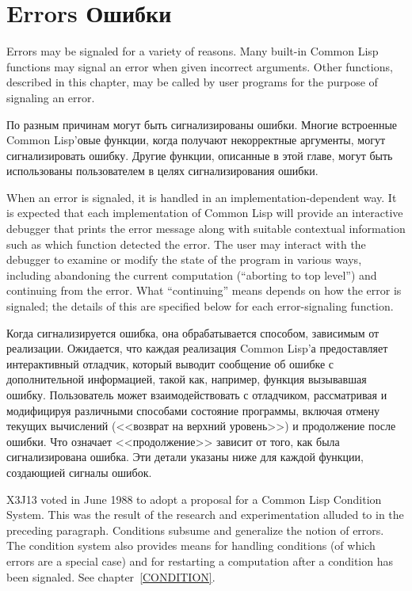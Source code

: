 
\clearpage\def\pagestatus{FINAL PROOF}

\chapter{Errors Ошибки}
\label{XERROR}

Errors may be signaled for a variety of reasons.
Many built-in Common Lisp functions may signal an error when given incorrect
arguments.  Other functions, described in this chapter,
may be called by user programs for the purpose of signaling
an error.

По разным причинам могут быть сигнализированы ошибки.
Многие встроенные Common Lisp'овые функции, когда получают некорректные
аргументы, могут сигнализировать ошибку. Другие функции, описанные в этой главе,
могут быть использованы пользователем в целях сигнализирования ошибки.

When an error is signaled, it is
handled in an implementation-dependent way.  It is expected
that each implementation of Common Lisp will provide an interactive debugger that
prints the error message along with suitable contextual information
such as which function detected the error.  The user may interact with
the debugger to examine or modify the state of the program in various
ways, including abandoning the current computation (``aborting to top
level'') and continuing from the error.  What ``continuing'' means
depends on how the error is signaled; the details of this are specified below
for each error-signaling function.

Когда сигнализируется ошибка, она обрабатывается способом, зависимым от
реализации. Ожидается, что каждая реализация Common Lisp'а предоставляет
интерактивный отладчик, который выводит сообщение об ошибке с дополнительной
информацией, такой как, например, функция вызывавшая ошибку. Пользователь может
взаимодействовать с отладчиком, рассматривая и модифицируя различными способами
состояние программы, включая отмену текущих вычислений (<<возврат на верхний
уровень>>) и продолжение после ошибки. Что означает <<продолжение>> зависит от
того, как была сигнализирована ошибка. Эти детали указаны ниже для каждой
функции, создающией сигналы ошибок.

\begin{newer}
X3J13 voted in June 1988
to adopt a proposal for a Common Lisp Condition System.
This was the result of the research and experimentation
alluded to in the preceding paragraph.
Conditions subsume and generalize the notion of errors.
The condition system also provides means for handling
conditions (of which errors are a special case) and
for restarting a computation after a condition has been signaled.
See chapter~\ref{CONDITION}.
\end{newer}

